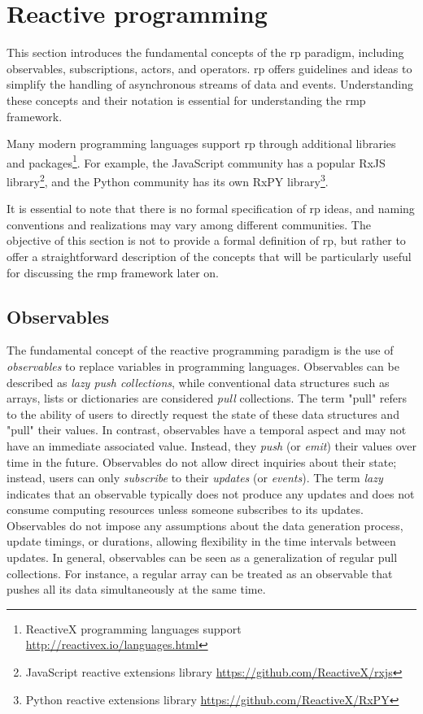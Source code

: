 \section{Reactive programming}\label{chapter-03:section:reactive-programming}

This section introduces the fundamental concepts of the \acf{rp} paradigm,
including observables, subscriptions, actors, and operators.
\ac{rp} offers guidelines and ideas to simplify the handling of asynchronous streams of data and
events.
Understanding these concepts and their notation is essential for understanding the \ac{rmp}
framework.

Many modern programming languages support \ac{rp} through additional libraries and
packages\footnote{ReactiveX programming languages support
  \url{http://reactivex.io/languages.html}}.
For example, the JavaScript community has a popular RxJS library\footnote{JavaScript reactive
  extensions library \url{https://github.com/ReactiveX/rxjs}}, 
  and the Python community has its own RxPY library\footnote{Python reactive
  extensions library \url{https://github.com/ReactiveX/RxPY}}.

It is essential to note that there is no formal specification of \ac{rp} ideas, and naming
conventions and realizations may vary among different communities.
The objective of this section is not to provide a formal definition of \ac{rp}, but rather to offer
a straightforward description of the concepts that will be particularly useful for discussing
the \ac{rmp} framework later on.

\subsection{Observables}

The fundamental concept of the reactive programming paradigm is the use of
\textit{observables} to replace variables in programming languages.
Observables can be described as \textit{lazy push collections}, while conventional data
structures such as arrays, lists or dictionaries are considered \emph{pull} collections.
The term "pull" refers to the ability of users to directly request the state of these data
structures and "pull" their values.
In contrast, observables have a temporal aspect and may not have an immediate associated
value.
Instead, they \textit{push} (or \textit{emit}) their values over time in the future.
Observables do not allow direct inquiries about their state; instead, users can only
\textit{subscribe} to their \textit{updates} (or \textit{events}).
The term \textit{lazy} indicates that an observable typically does not produce any updates and
does not consume computing resources unless someone subscribes to its updates.
Observables do not impose any assumptions about the data generation process, update timings,
or durations, allowing flexibility in the time intervals between updates.
In general, observables can be seen as a generalization of regular pull collections.
For instance, a regular array can be treated as an observable that pushes all its data
simultaneously at the same time.


